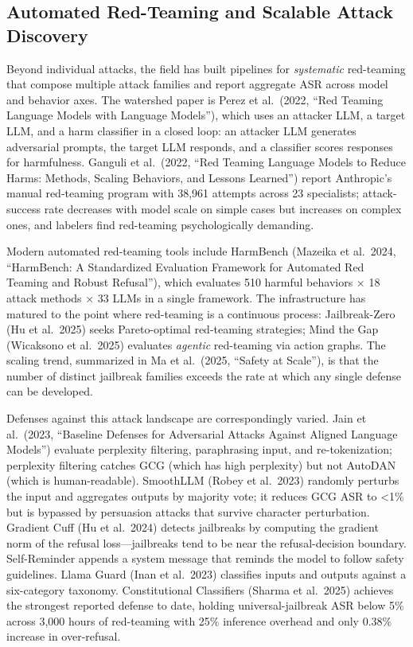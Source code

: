 \subsection{Automated Red-Teaming and Scalable Attack Discovery}\label{automated-red-teaming-and-scalable-attack-discovery}

Beyond individual attacks, the field has built pipelines for \emph{systematic} red-teaming that compose multiple attack families and report aggregate ASR across model and behavior axes. The watershed paper is Perez et al.~(2022, ``Red Teaming Language Models with Language Models''), which uses an attacker LLM, a target LLM, and a harm classifier in a closed loop: an attacker LLM generates adversarial prompts, the target LLM responds, and a classifier scores responses for harmfulness. Ganguli et al.~(2022, ``Red Teaming Language Models to Reduce Harms: Methods, Scaling Behaviors, and Lessons Learned'') report Anthropic's manual red-teaming program with 38,961 attempts across 23 specialists; attack-success rate decreases with model scale on simple cases but increases on complex ones, and labelers find red-teaming psychologically demanding.

Modern automated red-teaming tools include HarmBench (Mazeika et al.~2024, ``HarmBench: A Standardized Evaluation Framework for Automated Red Teaming and Robust Refusal''), which evaluates 510 harmful behaviors × 18 attack methods × 33 LLMs in a single framework. The infrastructure has matured to the point where red-teaming is a continuous process: Jailbreak-Zero (Hu et al.~2025) seeks Pareto-optimal red-teaming strategies; Mind the Gap (Wicaksono et al.~2025) evaluates \emph{agentic} red-teaming via action graphs. The scaling trend, summarized in Ma et al.~(2025, ``Safety at Scale''), is that the number of distinct jailbreak families exceeds the rate at which any single defense can be developed.

Defenses against this attack landscape are correspondingly varied. Jain et al.~(2023, ``Baseline Defenses for Adversarial Attacks Against Aligned Language Models'') evaluate perplexity filtering, paraphrasing input, and re-tokenization; perplexity filtering catches GCG (which has high perplexity) but not AutoDAN (which is human-readable). SmoothLLM (Robey et al.~2023) randomly perturbs the input and aggregates outputs by majority vote; it reduces GCG ASR to \textless1\% but is bypassed by persuasion attacks that survive character perturbation. Gradient Cuff (Hu et al.~2024) detects jailbreaks by computing the gradient norm of the refusal loss---jailbreaks tend to be near the refusal-decision boundary. Self-Reminder appends a system message that reminds the model to follow safety guidelines. Llama Guard (Inan et al.~2023) classifies inputs and outputs against a six-category taxonomy. Constitutional Classifiers (Sharma et al.~2025) achieves the strongest reported defense to date, holding universal-jailbreak ASR below 5\% across 3,000 hours of red-teaming with 25\% inference overhead and only 0.38\% increase in over-refusal.


